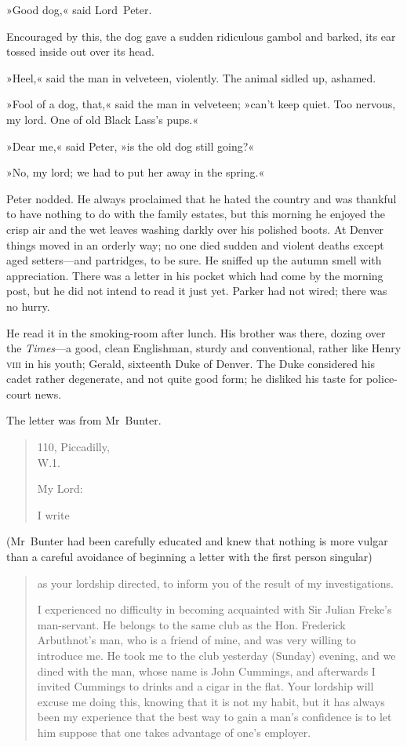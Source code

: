 »Good dog,« said Lord~Peter.

Encouraged by this, the dog gave a sudden ridiculous gambol and barked, its ear tossed inside out over its head.

»Heel,« said the man in velveteen, violently. The animal sidled up, ashamed.

»Fool of a dog, that,« said the man in velveteen; »can't keep quiet. Too nervous, my lord. One of old Black Lass's pups.«

»Dear me,« said Peter, »is the old dog still going?«

»No, my lord; we had to put her away in the spring.«

Peter nodded. He always proclaimed that he hated the country and was thankful to have nothing to do with the family estates, but this morning he enjoyed the crisp air and the wet leaves washing darkly over his polished boots. At Denver things moved in an orderly way; no one died sudden and violent deaths except aged setters—and partridges, to be sure. He sniffed up the autumn smell with appreciation. There was a letter in his pocket which had come by the morning post, but he did not intend to read it just yet. Parker had not wired; there was no hurry.

He read it in the smoking-room after lunch. His brother was there, dozing over the \textit{Times}---a good, clean Englishman, sturdy and conventional, rather like Henry \textsc{viii} in his youth; Gerald, sixteenth Duke of Denver. The Duke considered his cadet rather degenerate, and not quite good form; he disliked his taste for police-court news.

The letter was from Mr~Bunter.

\clearpage


\begin{quotation}
\begin{flushright}
110, Piccadilly,\\
W\@.1.
\end{flushright}

\noindent My Lord:

I write 
\end{quotation}

(Mr~Bunter had been carefully educated and knew that nothing is more vulgar than a careful avoidance of beginning a letter with the first person singular) 

\begin{quotation}
as your lordship directed, to inform you of the result of my investigations.

I experienced no difficulty in becoming acquainted with Sir Julian Freke's man-servant. He belongs to the same club as the Hon. Frederick Arbuthnot's man, who is a friend of mine, and was very willing to introduce me. He took me to the club yesterday (Sunday) evening, and we dined with the man, whose name is John Cummings, and afterwards I invited Cummings to drinks and a cigar in the flat. Your lordship will excuse me doing this, knowing that it is not my habit, but it has always been my experience that the best way to gain a man's confidence is to let him suppose that one takes advantage of one's employer.
\end{quotation}

